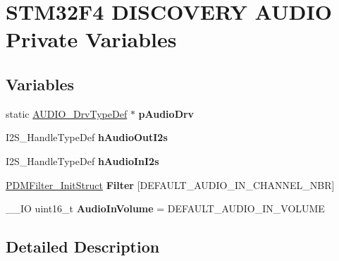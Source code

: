 \hypertarget{group___s_t_m32_f4___d_i_s_c_o_v_e_r_y___a_u_d_i_o___private___variables}{}\section{S\+T\+M32\+F4 D\+I\+S\+C\+O\+V\+E\+RY A\+U\+D\+IO Private Variables}
\label{group___s_t_m32_f4___d_i_s_c_o_v_e_r_y___a_u_d_i_o___private___variables}
\subsection*{Variables}
\begin{DoxyCompactItemize}
\item 
\mbox{\label{group___s_t_m32_f4___d_i_s_c_o_v_e_r_y___a_u_d_i_o___private___variables_gaa33628039247fcef374e207192d19e09}} 
static \mbox{\hyperlink{struct_a_u_d_i_o___drv_type_def}{A\+U\+D\+I\+O\+\_\+\+Drv\+Type\+Def}} $\ast$ {\bfseries p\+Audio\+Drv}
\item 
\mbox{\label{group___s_t_m32_f4___d_i_s_c_o_v_e_r_y___a_u_d_i_o___private___variables_ga9734e3359903aa5c2318ce34dd5ac3a2}} 
I2\+S\+\_\+\+Handle\+Type\+Def {\bfseries h\+Audio\+Out\+I2s}
\item 
\mbox{\label{group___s_t_m32_f4___d_i_s_c_o_v_e_r_y___a_u_d_i_o___private___variables_ga6747a14576e091de69a037af315fe89b}} 
I2\+S\+\_\+\+Handle\+Type\+Def {\bfseries h\+Audio\+In\+I2s}
\item 
\mbox{\label{group___s_t_m32_f4___d_i_s_c_o_v_e_r_y___a_u_d_i_o___private___variables_ga16be328289dcb65ae645fdb1988e89e3}} 
\mbox{\hyperlink{struct_p_d_m_filter___init_struct}{P\+D\+M\+Filter\+\_\+\+Init\+Struct}} {\bfseries Filter} \mbox{[}D\+E\+F\+A\+U\+L\+T\+\_\+\+A\+U\+D\+I\+O\+\_\+\+I\+N\+\_\+\+C\+H\+A\+N\+N\+E\+L\+\_\+\+N\+BR\mbox{]}
\item 
\mbox{\label{group___s_t_m32_f4___d_i_s_c_o_v_e_r_y___a_u_d_i_o___private___variables_gaa7ea32df300b1ecd063e28c21da56076}} 
\+\_\+\+\_\+\+IO uint16\+\_\+t {\bfseries Audio\+In\+Volume} = D\+E\+F\+A\+U\+L\+T\+\_\+\+A\+U\+D\+I\+O\+\_\+\+I\+N\+\_\+\+V\+O\+L\+U\+ME
\end{DoxyCompactItemize}


\subsection{Detailed Description}
